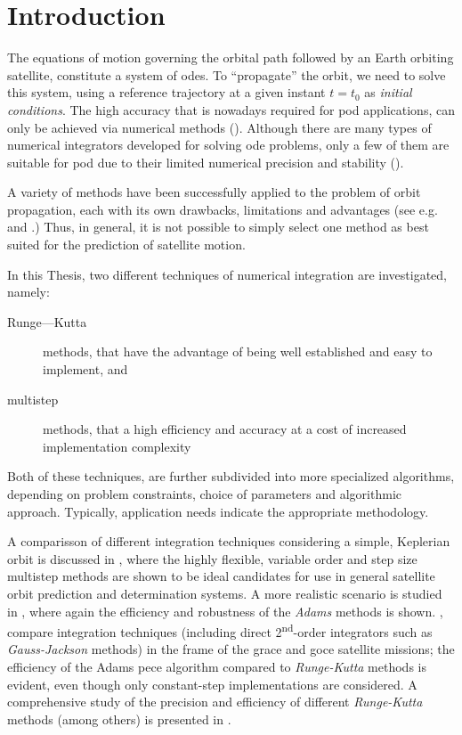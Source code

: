 \section{Introduction}\label{sec:integration-introduction}

The equations of motion governing the orbital path followed by an Earth orbiting 
satellite, constitute a system of \glspl{ode}. To ``propagate'' the orbit, we need 
to solve this system, using a reference trajectory at a given instant $t=t_0$ as 
\emph{initial conditions}. The high accuracy that is nowadays required for \gls{pod} 
applications, can only be achieved via numerical methods (\cite{Montenbruck2000}).
Although there are many types of numerical integrators developed for solving \gls{ode} 
problems, only a few of them are suitable for \gls{pod} due to their limited 
numerical precision and stability (\cite{Yufeng2020}).

A variety of methods have been successfully applied to the problem of orbit 
propagation, each with its own drawbacks, limitations and advantages (see e.g.
\cite{Somodi2011} and \cite{Atallah2020}.)
Thus, in general, it is not possible to simply select one method as best 
suited for the prediction of satellite motion.

In this Thesis, two different techniques of numerical integration are investigated, 
namely:
\begin{description}
    \item[Runge—Kutta] methods, that have the advantage of being well established 
      and easy to implement, and
    \item[multistep] methods, that a high efficiency and accuracy at a cost of 
      increased implementation complexity
\end{description}
Both of these techniques, are further subdivided into more specialized algorithms, 
depending on problem constraints, choice of parameters and algorithmic approach. 
Typically, application needs indicate the appropriate methodology.

A comparisson of different integration techniques considering a simple, Keplerian
orbit is discussed in \cite{Montenbruck1992}, where the highly flexible, variable
order and step size multistep methods are shown to be ideal candidates for use 
in general satellite orbit prediction and determination systems. A more realistic 
scenario is studied in \cite{Somodi2011}, where again the efficiency and robustness 
of the \emph{Adams} methods is shown. 
\cite{Papanikolaou2016}, compare integration techniques (including direct 
2\textsuperscript{nd}-order integrators such as \emph{Gauss-Jackson} methods) 
in the frame of the \gls{grace} and \gls{goce} satellite missions; the efficiency 
of the Adams \gls{pece} algorithm compared to \emph{Runge-Kutta} methods is evident, 
even though only constant-step implementations are considered. A comprehensive 
study of the precision and efficiency of different \emph{Runge-Kutta} methods 
(among others) is presented in \cite{Atallah2020}.

